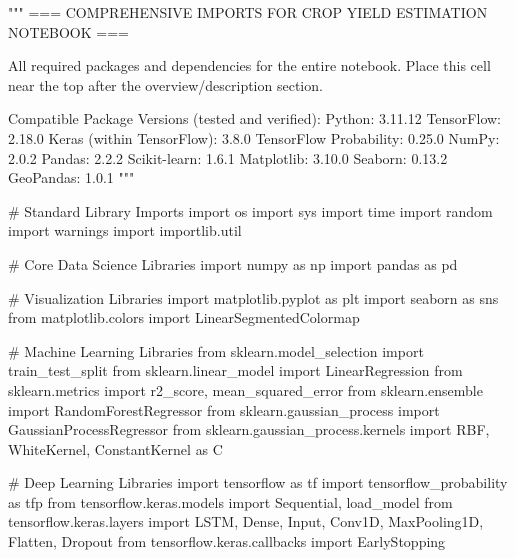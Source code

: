 \documentclass[
  letterpaper,
  DIV=11,
  numbers=noendperiod]{scrreprt}
\newenvironment{Shaded}{\begin{snugshade}}{\end{snugshade}}
\newcommand{\CommentTok}[1]{\textcolor[rgb]{0.37,0.37,0.37}{#1}}
\newcommand{\ImportTok}[1]{\textcolor[rgb]{0.00,0.46,0.62}{#1}}
\newcommand{\NormalTok}[1]{\textcolor[rgb]{0.00,0.23,0.31}{#1}}
\begin{document}
\begin{Shaded}
\begin{Highlighting}[]
\CommentTok{"""}
\CommentTok{=== COMPREHENSIVE IMPORTS FOR CROP YIELD ESTIMATION NOTEBOOK ===}

\CommentTok{All required packages and dependencies for the entire notebook.}
\CommentTok{Place this cell near the top after the overview/description section.}

\CommentTok{Compatible Package Versions (tested and verified):}
\CommentTok{Python: 3.11.12}
\CommentTok{TensorFlow: 2.18.0}
\CommentTok{Keras (within TensorFlow): 3.8.0}
\CommentTok{TensorFlow Probability: 0.25.0}
\CommentTok{NumPy: 2.0.2}
\CommentTok{Pandas: 2.2.2}
\CommentTok{Scikit{-}learn: 1.6.1}
\CommentTok{Matplotlib: 3.10.0}
\CommentTok{Seaborn: 0.13.2}
\CommentTok{GeoPandas: 1.0.1}
\CommentTok{"""}

\CommentTok{\# Standard Library Imports}
\ImportTok{import}\NormalTok{ os}
\ImportTok{import}\NormalTok{ sys}
\ImportTok{import}\NormalTok{ time}
\ImportTok{import}\NormalTok{ random}
\ImportTok{import}\NormalTok{ warnings}
\ImportTok{import}\NormalTok{ importlib.util}

\CommentTok{\# Core Data Science Libraries}
\ImportTok{import}\NormalTok{ numpy }\ImportTok{as}\NormalTok{ np}
\ImportTok{import}\NormalTok{ pandas }\ImportTok{as}\NormalTok{ pd}

\CommentTok{\# Visualization Libraries}
\ImportTok{import}\NormalTok{ matplotlib.pyplot }\ImportTok{as}\NormalTok{ plt}
\ImportTok{import}\NormalTok{ seaborn }\ImportTok{as}\NormalTok{ sns}
\ImportTok{from}\NormalTok{ matplotlib.colors }\ImportTok{import}\NormalTok{ LinearSegmentedColormap}

\CommentTok{\# Machine Learning Libraries}
\ImportTok{from}\NormalTok{ sklearn.model\_selection }\ImportTok{import}\NormalTok{ train\_test\_split}
\ImportTok{from}\NormalTok{ sklearn.linear\_model }\ImportTok{import}\NormalTok{ LinearRegression}
\ImportTok{from}\NormalTok{ sklearn.metrics }\ImportTok{import}\NormalTok{ r2\_score, mean\_squared\_error}
\ImportTok{from}\NormalTok{ sklearn.ensemble }\ImportTok{import}\NormalTok{ RandomForestRegressor}
\ImportTok{from}\NormalTok{ sklearn.gaussian\_process }\ImportTok{import}\NormalTok{ GaussianProcessRegressor}
\ImportTok{from}\NormalTok{ sklearn.gaussian\_process.kernels }\ImportTok{import}\NormalTok{ RBF, WhiteKernel, ConstantKernel }\ImportTok{as}\NormalTok{ C}

\CommentTok{\# Deep Learning Libraries}
\ImportTok{import}\NormalTok{ tensorflow }\ImportTok{as}\NormalTok{ tf}
\ImportTok{import}\NormalTok{ tensorflow\_probability }\ImportTok{as}\NormalTok{ tfp}
\ImportTok{from}\NormalTok{ tensorflow.keras.models }\ImportTok{import}\NormalTok{ Sequential, load\_model}
\ImportTok{from}\NormalTok{ tensorflow.keras.layers }\ImportTok{import}\NormalTok{ LSTM, Dense, Input, Conv1D, MaxPooling1D, Flatten, Dropout}
\ImportTok{from}\NormalTok{ tensorflow.keras.callbacks }\ImportTok{import}\NormalTok{ EarlyStopping}


\end{Highlighting}
\end{Shaded}
\end{document}
